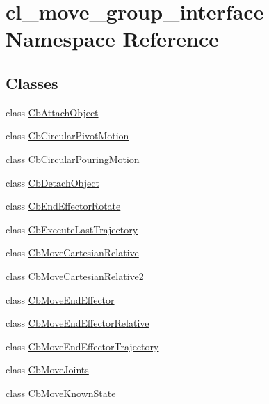\hypertarget{namespacecl__move__group__interface}{}\section{cl\+\_\+move\+\_\+group\+\_\+interface Namespace Reference}
\label{namespacecl__move__group__interface}
\subsection*{Classes}
\begin{DoxyCompactItemize}
\item 
class \hyperlink{classcl__move__group__interface_1_1CbAttachObject}{Cb\+Attach\+Object}
\item 
class \hyperlink{classcl__move__group__interface_1_1CbCircularPivotMotion}{Cb\+Circular\+Pivot\+Motion}
\item 
class \hyperlink{classcl__move__group__interface_1_1CbCircularPouringMotion}{Cb\+Circular\+Pouring\+Motion}
\item 
class \hyperlink{classcl__move__group__interface_1_1CbDetachObject}{Cb\+Detach\+Object}
\item 
class \hyperlink{classcl__move__group__interface_1_1CbEndEffectorRotate}{Cb\+End\+Effector\+Rotate}
\item 
class \hyperlink{classcl__move__group__interface_1_1CbExecuteLastTrajectory}{Cb\+Execute\+Last\+Trajectory}
\item 
class \hyperlink{classcl__move__group__interface_1_1CbMoveCartesianRelative}{Cb\+Move\+Cartesian\+Relative}
\item 
class \hyperlink{classcl__move__group__interface_1_1CbMoveCartesianRelative2}{Cb\+Move\+Cartesian\+Relative2}
\item 
class \hyperlink{classcl__move__group__interface_1_1CbMoveEndEffector}{Cb\+Move\+End\+Effector}
\item 
class \hyperlink{classcl__move__group__interface_1_1CbMoveEndEffectorRelative}{Cb\+Move\+End\+Effector\+Relative}
\item 
class \hyperlink{classcl__move__group__interface_1_1CbMoveEndEffectorTrajectory}{Cb\+Move\+End\+Effector\+Trajectory}
\item 
class \hyperlink{classcl__move__group__interface_1_1CbMoveJoints}{Cb\+Move\+Joints}
\item 
class \hyperlink{classcl__move__group__interface_1_1CbMoveKnownState}{Cb\+Move\+Known\+State}
\item 

\end{DoxyCompactItemize}
